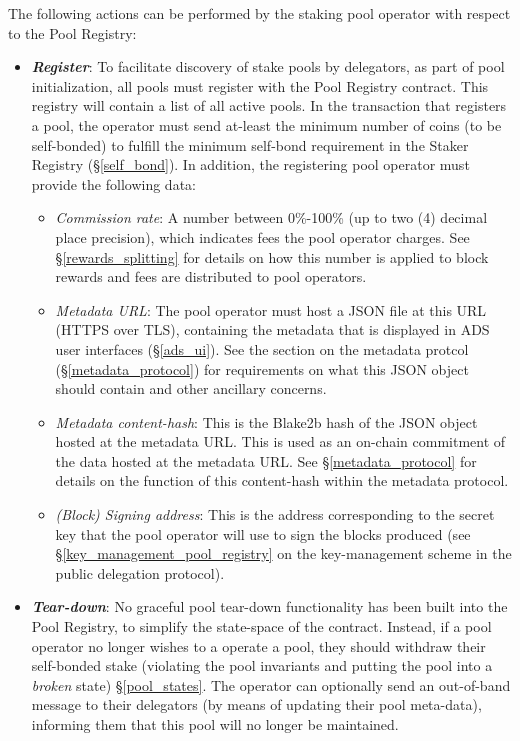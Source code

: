 The following actions can be performed by the staking pool operator with respect to the Pool Registry: 
\begin{itemize}
    \item \textbf{\textit{Register}}: To facilitate discovery of stake pools by delegators, as part of pool initialization, all pools must register with the Pool Registry contract. This registry will contain a list of all active pools. In the transaction that registers a pool, the operator must send at-least the minimum number of coins (to be self-bonded) to fulfill the minimum self-bond requirement in the Staker Registry (\S\ref{self_bond}). In addition, the registering pool operator must provide the following data: 
    \begin{itemize}
        \item \textit{Commission rate}: A number between 0\%-100\% (up to two (4) decimal place precision), which indicates fees the pool operator charges. See \S\ref{rewards_splitting} for details on how this number is applied to block rewards and fees are distributed to pool operators. 
        \item \textit{Metadata URL}: The pool operator must host a JSON file at this URL (HTTPS over TLS), containing the metadata that is displayed in ADS user interfaces (\S\ref{ads_ui}). See the section on the metadata protcol (\S\ref{metadata_protocol}) for requirements on what this JSON object should contain and other ancillary concerns. 
        \item \textit{Metadata content-hash}: This is the Blake2b hash of the JSON object hosted at the metadata URL. This is used as an on-chain commitment of the data hosted at the metadata URL. See \S\ref{metadata_protocol} for details on the function of this content-hash within the metadata protocol. 
        \item \textit{(Block) Signing address}: This is the address corresponding to the secret key that the pool operator will use to sign the blocks produced (see \S\ref{key_management_pool_registry} on the key-management scheme in the public delegation protocol). 
    \end{itemize}
    
    \item \textbf{\textit{Tear-down}}: No graceful pool tear-down functionality has been built into the Pool Registry, to simplify the state-space of the contract. Instead, if a pool operator no longer wishes to a operate a pool, they should withdraw their self-bonded stake (violating the pool invariants and putting the pool into a \textit{broken} state) \S\ref{pool_states}. The operator can optionally send an out-of-band message to their delegators (by means of updating their pool meta-data), informing them that this pool will no longer be maintained. 
        

\end{itemize}
